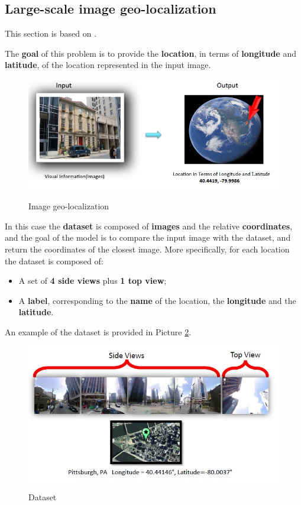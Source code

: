\subsection{Large-scale image geo-localization}
This section is based on \cite{zemene2018large}.

The \textbf{goal} of this problem is to provide the \textbf{location}, in terms of \textbf{longitude} and \textbf{latitude}, of the location represented in the input image.

\begin{figure}[h!]
    \centering
    \includegraphics[scale = 1.5]{img/geo1.jpg}
    \label{geo1}
    \caption{Image geo-localization}
\end{figure}

In this case the \textbf{dataset} is composed of \textbf{images} and the relative \textbf{coordinates}, and the goal of the model is to compare the input image with the dataset, and return the coordinates of the closest image. More specifically, for each location the dataset is composed of:

\begin{itemize}
    \item A set of \textbf{4 side views} plus \textbf{1 top view};
    \item A \textbf{label}, corresponding to the \textbf{name} of the location, the \textbf{longitude} and the \textbf{latitude}.
\end{itemize}

An example of the dataset is provided in Picture \ref{geo2}.

\begin{figure}[h!]
    \centering
    \includegraphics[scale = 1.5]{img/geo2.jpg}
    \label{geo2}
    \caption{Dataset}
\end{figure}

